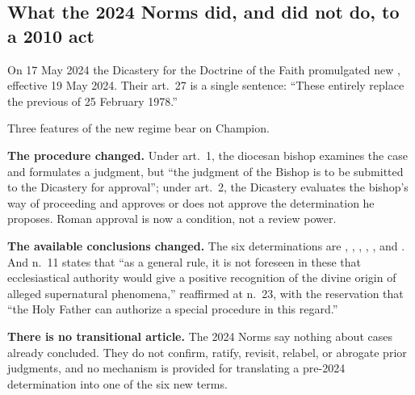 \subsection{What the 2024 Norms did, and did not do, to a 2010 act}

On 17 May 2024 the Dicastery for the Doctrine of the Faith promulgated
new , effective 19 May 2024. Their art.~27 is a
single sentence: ``These  entirely replace the previous
 of 25 February 1978.''

Three features of the new regime bear on Champion.

\textbf{The procedure changed.} Under art.~1, the diocesan bishop
examines the case and formulates a judgment, but ``the judgment of the
Bishop is to be submitted to the Dicastery for approval''; under
art.~2, the Dicastery evaluates the bishop's way of proceeding and
approves or does not approve the determination he proposes. Roman
approval is now a condition, not a review power.

\textbf{The available conclusions changed.} The six determinations are
, , ,
, , and
. And n.~11 states that ``as
a general rule, it is not foreseen in these  that
ecclesiastical authority would give a positive recognition of the
divine origin of alleged supernatural phenomena,'' reaffirmed at n.~23,
with the reservation that ``the Holy Father can authorize a special
procedure in this regard.''

\textbf{There is no transitional article.} The 2024 Norms say nothing
about cases already concluded. They do not confirm, ratify, revisit,
relabel, or abrogate prior judgments, and no mechanism is provided for
translating a pre-2024 determination into one of the six new terms.

